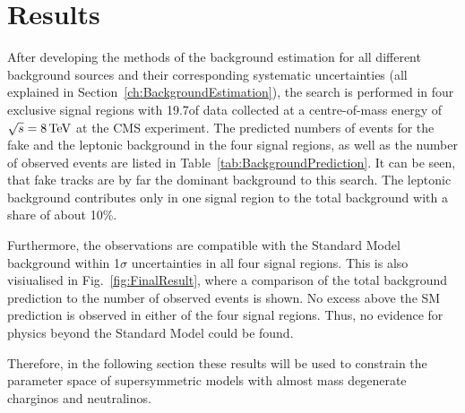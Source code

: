 \FloatBarrier
\chapter{Results}
\label{sec:Results}
After developing the methods of the background estimation for all different background sources and their corresponding systematic uncertainties (all explained in Section~\ref{ch:BackgroundEstimation}), 
the search is performed in four exclusive signal regions with 19.7\fbinv of data collected at a centre-of-mass energy of $\sqrt{s} = 8\,\text{Te}\kern-0.06667em\text{V}$ at the CMS experiment.
The predicted numbers of events for the fake and the leptonic background in the four signal regions, as well as the number of observed events are listed in Table~\ref{tab:BackgroundPrediction}.
It can be seen, that fake tracks are by far the dominant background to this search.
The leptonic background contributes only in one signal region to the total background with a share of about 10\%.

Furthermore, the observations are compatible with the Standard Model background within 1$\sigma$ uncertainties in all four signal regions.
This is also visiualised in Fig.~\ref{fig:FinalResult}, where a comparison of the total background prediction to the number of observed events is shown.
No excess above the SM prediction is observed in either of the four signal regions.
Thus, no evidence for physics beyond the Standard Model could be found.

Therefore, in the following section these results will be used to constrain the parameter space of supersymmetric models with almost mass degenerate charginos and neutralinos.

